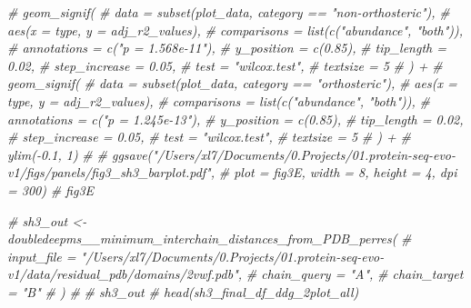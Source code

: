 \documentclass[
]{article}
\newenvironment{Shaded}{\begin{snugshade}}{\end{snugshade}}
\newcommand{\CommentTok}[1]{\textcolor[rgb]{0.56,0.35,0.01}{\textit{#1}}}
\begin{document}
\begin{Shaded}
\begin{Highlighting}[]
\CommentTok{\#   geom\_signif(}
\CommentTok{\#     data = subset(plot\_data, category == "non{-}orthosteric"),}
\CommentTok{\#     aes(x = type, y = adj\_r2\_values),}
\CommentTok{\#     comparisons = list(c("abundance", "both")),}
\CommentTok{\#     annotations = c("p = 1.568e{-}11"),}
\CommentTok{\#     y\_position = c(0.85),}
\CommentTok{\#     tip\_length = 0.02,}
\CommentTok{\#     step\_increase = 0.05,}
\CommentTok{\#     test = "wilcox.test",}
\CommentTok{\#     textsize = 5}
\CommentTok{\#   ) +}
\CommentTok{\#   geom\_signif(}
\CommentTok{\#     data = subset(plot\_data, category == "orthosteric"),}
\CommentTok{\#     aes(x = type, y = adj\_r2\_values),}
\CommentTok{\#     comparisons = list(c("abundance", "both")),}
\CommentTok{\#     annotations = c("p = 1.245e{-}13"),}
\CommentTok{\#     y\_position = c(0.85),}
\CommentTok{\#     tip\_length = 0.02,}
\CommentTok{\#     step\_increase = 0.05,}
\CommentTok{\#     test = "wilcox.test",}
\CommentTok{\#     textsize = 5}
\CommentTok{\#   ) +}
\CommentTok{\#   ylim({-}0.1, 1)}
\CommentTok{\# }
\CommentTok{\# ggsave("/Users/xl7/Documents/0.Projects/01.protein{-}seq{-}evo{-}v1/figs/panels/fig3\_sh3\_barplot.pdf", }
\CommentTok{\#        plot = fig3E, width = 8, height = 4, dpi = 300)}
\CommentTok{\# fig3E}
\end{Highlighting}
\end{Shaded}

\begin{Shaded}
\begin{Highlighting}[]
\CommentTok{\# sh3\_out \textless{}{-} doubledeepms\_\_minimum\_interchain\_distances\_from\_PDB\_perres(}
\CommentTok{\#   input\_file = "/Users/xl7/Documents/0.Projects/01.protein{-}seq{-}evo{-}v1/data/residual\_pdb/domains/2vwf.pdb",}
\CommentTok{\#   chain\_query = "A",}
\CommentTok{\#   chain\_target = "B"}
\CommentTok{\# )}
\CommentTok{\# }
\CommentTok{\# sh3\_out}
\CommentTok{\# head(sh3\_final\_df\_ddg\_2plot\_all)}
\end{Highlighting}
\end{Shaded}
\end{document}
